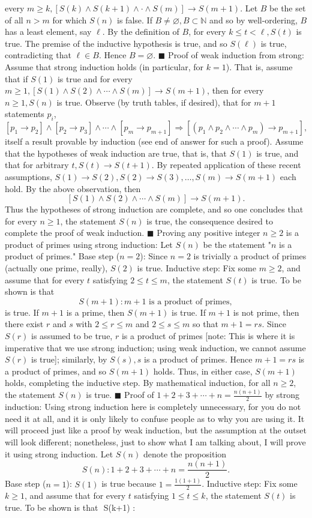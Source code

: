 \documentclass{article}
\begin{document}
every $m\geq k, [S(k)\land S(k+1)\land\cdot\land S(m)]\to S(m+1)$. Let $B$ be the set of all $n>m$ for which $S(n)$ is false. If $B\neq\varnothing, B\subset\mathbb{N}$ and so by well-ordering, $B$ has a least element, say $\ell$. By the definition of $B$, for every $k\leq t<\ell, S(t)$ is true. The premise of the inductive hypothesis is true, and so $S(\ell)$ is true, contradicting that $\ell\in B$. Hence $B=\varnothing$. $\blacksquare$ Proof of weak induction from strong: Assume that strong induction holds (in particular, for $k=1$). That is, assume that if $S(1)$ is true and for every $m\geq 1, [S(1)\land S(2)\land\cdots\land S(m)]\to S(m+1)$, then for every $n\geq 1, S(n)$ is true. Observe (by truth tables, if desired), that for $m+1$ statements $p_i$, $$ [p_1\to p_2]\land[p_2\to p_3]\land\cdots\land[p_m\to p_{m+1}]\Rightarrow[(p_1\land p_2\land\cdots\land p_m)\to p_{m+1}],\tag{$\dagger$} $$ itself a result provable by induction (see end of answer for such a proof). Assume that the hypotheses of weak induction are true, that is, that $S(1)$ is true, and that for arbitrary $t, S(t)\to S(t+1)$. By repeated application of these recent assumptions, $S(1)\to S(2), S(2)\to S(3),\ldots, S(m)\to S(m+1)$ each hold. By the above observation, then $$ [S(1)\land S(2)\land\cdots\land S(m)]\to S(m+1). $$ Thus the hypotheses of strong induction are complete, and so one concludes that for every $n\geq 1$, the statement $S(n)$ is true, the consequence desired to complete the proof of weak induction. $\blacksquare$ Proving any positive integer $n\geq 2$ is a product of primes using strong induction: Let $S(n)$ be the statement "$n$ is a product of primes." Base step ($n=2$): Since $n=2$ is trivially a product of primes (actually one prime, really), $S(2)$ is true. Inductive step: Fix some $m\geq 2$, and assume that for every $t$ satisfying $2\leq t\leq m$, the statement $S(t)$ is true. To be shown is that $$ S(m+1) : m+1 \text{ is a product of primes}, $$ is true. If $m+1$ is a prime, then $S(m+1)$ is true. If $m+1$ is not prime, then there exist $r$ and $s$ with $2\leq r\leq m$ and $2\leq s\leq m$ so that $m+1=rs$. Since $S(r)$ is assumed to be true, $r$ is a product of primes [note: This is where it is imperative that we use strong induction; using weak induction, we cannot assume $S(r)$ is true]; similarly, by $S(s), s$ is a product of primes. Hence $m+1=rs$ is a product of primes, and so $S(m+1)$ holds. Thus, in either case, $S(m+1)$ holds, completing the inductive step. By mathematical induction, for all $n\geq 2$, the statement $S(n)$ is true. $\blacksquare$ Proof of $1+2+3+\cdots+n = \frac{n(n+1)}{2}$ by strong induction: Using strong induction here is completely unnecessary, for you do not need it at all, and it is only likely to confuse people as to why you are using it. It will proceed just like a proof by weak induction, but the assumption at the outset will look different; nonetheless, just to show what I am talking about, I will prove it using strong induction. Let $S(n)$ denote the proposition $$ S(n) : 1+2+3+\cdots+n = \frac{n(n+1)}{2}. $$ Base step ($n=1$): $S(1)$ is true because $1=\frac{1(1+1)}{2}$. Inductive step: Fix some $k\geq 1$, and assume that for every $t$ satisfying $1\leq t\leq k$, the statement $S(t)$ is true. To be shown is that $$ S(k+1) : 
\end{document}
